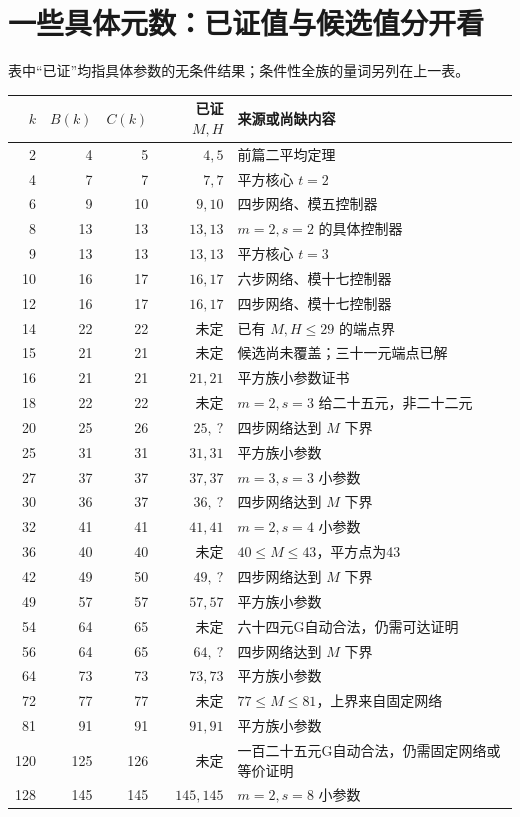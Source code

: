 \documentclass[11pt,a4paper,oneside,openany]{book}
\theoremstyle{definition}\newtheorem{example}[theorem]{例}\newtheorem{conjecture}[theorem]{猜想}
\numberwithin{equation}{chapter}\setcounter{tocdepth}{1}
\begin{document}
\section{一些具体元数：已证值与候选值分开看}
表中“已证”均指具体参数的无条件结果；条件性全族的量词另列在上一表。
\begin{longtable}{rrrrp{}}
\toprule $k$&$B(k)$&$C(k)$&已证 $M,H$&来源或尚缺内容\\\midrule\endhead
2&4&5&$4,5$&前篇二平均定理\\
4&7&7&$7,7$&平方核心 $t=2$\\
6&9&10&$9,10$&四步网络、模五控制器\\
8&13&13&$13,13$&$m=2,s=2$ 的具体控制器\\
9&13&13&$13,13$&平方核心 $t=3$\\
10&16&17&$16,17$&六步网络、模十七控制器\\
12&16&17&$16,17$&四步网络、模十七控制器\\
14&22&22&未定&已有 $M,H\le29$ 的端点界\\
15&21&21&未定&候选尚未覆盖；三十一元端点已解\\
16&21&21&$21,21$&平方族小参数证书\\
18&22&22&未定&$m=2,s=3$ 给二十五元，非二十二元\\
20&25&26&$25,\ ?$&四步网络达到 $M$ 下界\\
25&31&31&$31,31$&平方族小参数\\
27&37&37&$37,37$&$m=3,s=3$ 小参数\\
30&36&37&$36,\ ?$&四步网络达到 $M$ 下界\\
32&41&41&$41,41$&$m=2,s=4$ 小参数\\
36&40&40&未定&$40\le M\le43$，平方点为43\\
42&49&50&$49,\ ?$&四步网络达到 $M$ 下界\\
49&57&57&$57,57$&平方族小参数\\
54&64&65&未定&六十四元G自动合法，仍需可达证明\\
56&64&65&$64,\ ?$&四步网络达到 $M$ 下界\\
64&73&73&$73,73$&平方族小参数\\
72&77&77&未定&$77\le M\le81$，上界来自固定网络\\
81&91&91&$91,91$&平方族小参数\\
120&125&126&未定&一百二十五元G自动合法，仍需固定网络或等价证明\\
128&145&145&$145,145$&$m=2,s=8$ 小参数\\
\bottomrule
\end{longtable}
\end{document}
